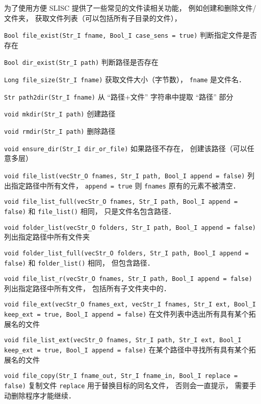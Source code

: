 
\begin{issues}
\issueDraft
\end{issues}

为了使用方便 SLISC 提供了一些常见的文件读相关功能， 例如创建和删除文件/文件夹， 获取文件列表（可以包括所有子目录的文件）， 

\verb|Bool file_exist(Str_I fname, Bool_I case_sens = true)| 判断指定文件是否存在

\verb|Bool dir_exist(Str_I path)| 判断路径是否存在

\verb|Long file_size(Str_I fname)| 获取文件大小（字节数）， \verb|fname| 是文件名．

\verb|Str path2dir(Str_I fname)| 从 “路径+文件” 字符串中提取 “路径” 部分

\verb|void mkdir(Str_I path)| 创建路径

\verb|void rmdir(Str_I path)| 删除路径

\verb|void ensure_dir(Str_I dir_or_file)| 如果路径不存在， 创建该路径（可以任意多层）

\verb|void file_list(vecStr_O fnames, Str_I path, Bool_I append = false)| 列出指定路径中所有文件， \verb|append = true| 则 \verb|fnames| 原有的元素不被清空．

\verb|void file_list_full(vecStr_O fnames, Str_I path, Bool_I append = false)| 和 \verb|file_list()| 相同， 只是文件名包含路径．

\verb|void folder_list(vecStr_O folders, Str_I path, Bool_I append = false)| 列出指定路径中所有文件夹

\verb|void folder_list_full(vecStr_O folders, Str_I path, Bool_I append = false)| 和 \verb|folder_list()| 相同， 但包含路径．

\verb|void file_list_r(vecStr_O fnames, Str_I path, Bool_I append = false)| 列出指定路径中所有文件， 包括所有子文件夹中的．

\verb|void file_ext(vecStr_O fnames_ext, vecStr_I fnames, Str_I ext, Bool_I keep_ext = true, Bool_I append = false)| 在文件列表中选出所有具有某个拓展名的文件

\verb|void file_list_ext(vecStr_O fnames, Str_I path, Str_I ext, Bool_I keep_ext = true, Bool_I append = false)| 在某个路径中寻找所有具有某个拓展名的文件

\verb|void file_copy(Str_I fname_out, Str_I fname_in, Bool_I replace = false)| 复制文件 \verb|replace| 用于替换目标的同名文件， 否则会一直提示， 需要手动删除程序才能继续．

